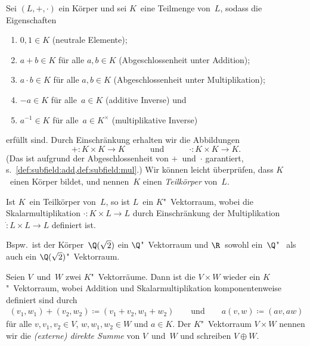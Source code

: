 \documentclass[a4paper]{article}
\begin{document}
\begin{definition}[Teilkörper]
    Sei $(L,+,\cdot)$ ein Körper und sei $K$~eine Teilmenge von~$L$, sodass die Eigenschaften
    \begin{enumerate}
        \item $0, 1 \in K$ (neutrale Elemente);
        \item $a+b \in K$ für alle $a,b \in K$ (Abgeschlossenheit unter Addition);\label{def:subfield:add}
        \item $a\cdot b \in K$ für alle $a,b \in K$ (Abgeschlossenheit unter Multiplikation);\label{def:subfield:mul}
        \item $-a \in K$ für alle~$a \in K$ (additive Inverse) und
        \item $a^{-1} \in K$ für alle~$a \in K^\times$ (multiplikative Inverse)
    \end{enumerate}
    erfüllt sind. Durch Einschränkung erhalten wir die Abbildungen
    \begin{equation*}
        +\colon K\times K \to K \quad\qquad\text{und}\qquad\quad \cdot\colon K\times K \to K.
    \end{equation*}
    (Das ist aufgrund der Abgeschlossenheit von $+$~und~$\cdot$ garantiert, s.~\cref{def:subfield:add,def:subfield:mul}.) Wir können leicht überprüfen, dass $K$~einen Körper bildet, und nennen~$K$ einen \emph{Teilkörper} von~$L$.
\end{definition}

\begin{example}
    Ist $K$~ein Teilkörper von~$L$, so ist $L$~ein $K$"~Vektorraum, wobei die Skalarmultiplikation $\cdot\colon K\times L \to L$ durch Einschränkung der Multiplikation $\dot\colon L\times L \to L$ definiert ist.

    Bspw.\ ist der Körper~$\Q(\sqrt{2})$ ein $\Q$"~Vektorraum und $\R$~sowohl ein~$\Q$"~ als auch ein $\Q(\sqrt{2})$"~Vektorraum.
\end{example}

\begin{definition}
    Seien $V$~und~$W$ zwei $K$"~Vektorräume. Dann ist die $V \times W$ wieder ein $K$"~Vektorraum, wobei Addition und Skalarmultiplikation komponentenweise definiert sind durch
    \begin{gather*}
        (v_1,w_1) + (v_2,w_2) \coloneqq (v_1+v_2, w_1+w_2) \qquad\text{und}\qquad a(v,w) \coloneqq (av, aw)
    \end{gather*}
    für alle $v,v_1,v_2 \in V$, $w,w_1,w_2 \in W$ und $a \in K$. Der $K$"~Vektorraum $V \times W$ nennen wir die \emph{(externe) direkte Summe} von $V$~und~$W$ und schreiben $V \oplus W$.
\end{definition}
\end{document}

